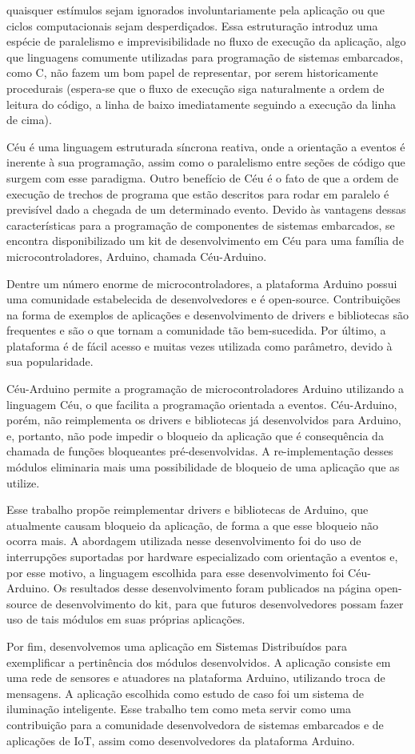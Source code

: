 \documentclass[11pt]{article}
\begin{document}
quaisquer estímulos sejam ignorados involuntariamente pela aplicação ou que ciclos computacionais
sejam desperdiçados. Essa estruturação introduz uma espécie de paralelismo e imprevisibilidade no
fluxo de execução da aplicação, algo que linguagens comumente utilizadas para programação de
sistemas embarcados, como C, não fazem um bom papel de representar, por serem historicamente
procedurais (espera-se que o fluxo de execução siga naturalmente a ordem de leitura do código, a
linha de baixo imediatamente seguindo a execução da linha de cima).
\par Céu é uma linguagem estruturada síncrona reativa, onde a orientação a eventos é
inerente à sua programação, assim como o paralelismo entre seções de código que surgem com esse
paradigma. Outro benefício de Céu é o fato de que a ordem de execução de
trechos de programa que estão descritos para rodar em paralelo é previsível dado a chegada de um
determinado evento.\cite{santanna2012} Devido às vantagens dessas características para a programação de
componentes de sistemas embarcados, se encontra disponibilizado um kit de desenvolvimento em Céu para
uma família de microcontroladores, Arduino, chamada Céu-Arduino.
\par Dentre um número enorme de microcontroladores, a plataforma Arduino possui uma comunidade estabelecida de desenvolvedores e é open-source. Contribuições na forma de exemplos de aplicações e desenvolvimento de drivers e bibliotecas são frequentes e são o que tornam a comunidade tão bem-sucedida. Por último, a plataforma é de fácil acesso e muitas vezes utilizada como parâmetro, devido à sua popularidade. \cite{arduinoblog}
\par Céu-Arduino permite a programação de microcontroladores Arduino utilizando a linguagem Céu, o
que facilita a programação orientada a eventos. Céu-Arduino, porém, não reimplementa os drivers e
bibliotecas já desenvolvidos para Arduino, e, portanto, não pode impedir o
bloqueio da aplicação que é consequência da chamada de funções bloqueantes pré-desenvolvidas. A
re-implementação desses módulos eliminaria mais uma possibilidade de bloqueio de uma aplicação
que as utilize.\cite{githubceuarduino}
\par Esse trabalho propõe reimplementar drivers e bibliotecas de Arduino, que atualmente causam
bloqueio da aplicação, de forma a que esse bloqueio não ocorra mais. A abordagem utilizada nesse
desenvolvimento foi do uso de interrupções suportadas por hardware especializado com orientação a
eventos e, por esse motivo, a linguagem escolhida para esse desenvolvimento foi Céu-Arduino. Os
resultados desse desenvolvimento foram publicados na página open-source de desenvolvimento do
kit, para que futuros desenvolvedores possam fazer uso de tais módulos em suas próprias aplicações.
\par Por fim, desenvolvemos uma aplicação em Sistemas Distribuídos para exemplificar a pertinência
dos módulos desenvolvidos. A aplicação consiste em uma rede de sensores e atuadores na
plataforma Arduino, utilizando troca de mensagens. A aplicação escolhida como estudo de caso foi um sistema de iluminação inteligente. Esse trabalho tem como meta servir como uma contribuição
para a comunidade desenvolvedora de sistemas embarcados e de aplicações de IoT, assim como
desenvolvedores da plataforma Arduino.
\end{document}
